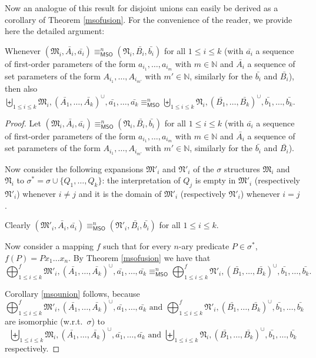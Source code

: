 \documentclass{LMCS}
\newcommand{\frM}{\mathfrak{M}}
\newcommand{\frN}{\mathfrak{N}}
\newcommand{\mso}{\textsf{MSO}\xspace}
\begin{document}
\noindent Now an analogue of this result for disjoint unions can easily be derived as a corollary of Theorem \ref{msofusion}. For the convenience of the reader, we provide here the detailed argument:


\begin{cor}
Whenever $(\frM_i,\bar{A_i},
\bar{a_i})\equiv_\mso^n(\frN_i,\bar{B_i},\bar{b_i})$ for all $1
\leq i \leq k$ (with $\bar{a_i}$ a sequence of first-order
parameters of the form $a_{i_1},\ldots,a_{i_m}$ with
$m\in\mathbb{N}$ and $\bar{A_i}$ a sequence of set parameters of
the form $A_{i_1},\ldots,A_{i_{m'}}$ with $m'\in\mathbb{N}$,
similarly for the $\bar{b_i}$ and $\bar{B_i}$), then also
$\biguplus_{ 1 \leq i \leq k} \frM_i,(\bar{A_1},
\ldots, \bar{A_k})^\cup, \bar{a_1},\ldots,\bar{a_k}\equiv_\mso^n
\biguplus_{ 1 \leq i \leq k} \frN_i, (\bar{B_1},
\ldots, \bar{B_k})^\cup, \bar{b_1},\ldots,\bar{b_k}$.\label{msounion}
\end{cor}

\begin{proof}
Let $(\frM_i,\bar{A_i},\bar{a_i})\equiv_\mso^n(\frN_i,\bar{B_i},\bar{b_i})$ for all $1
\leq i \leq k$ (with $\bar{a_i}$ a sequence of first-order
parameters of the form $a_{i_1},\ldots,a_{i_m}$ with
$m\in\mathbb{N}$ and $\bar{A_i}$ a sequence of set parameters of
the form $A_{i_1},\ldots,A_{i_{m'}}$ with $m'\in\mathbb{N}$,
similarly for the $\bar{b_i}$ and $\bar{B_i}$).

Now consider the following expansions $\frM'_i$ and $\frN'_i$ of the $\sigma$ structures $\frM_i$ and $\frN_i$ to $\sigma^*=\sigma \cup \{Q_1,\ldots,Q_k\}$:
the interpretation of $Q_j$ is empty in $\frM'_i$ (respectively $\frN'_i$) whenever $i \neq j$ and it is the domain of $\frM'_i$ (respectively $\frN'_i$) whenever $i=j$.

Clearly $(\frM'_i,\bar{A_i},\bar{a_i})\equiv_\mso^n(\frN'_i,\bar{B_i},\bar{b_i})$ for all $1
\leq i \leq k$.

Now consider a mapping $f$ such that for every $n$-ary predicate $P \in \sigma^*$, $f(P)=Px_1 \ldots x_n$. By Theorem \ref{msofusion} we have that $$\bigoplus_{1\leq i\leq k}^f \frM'_i,(\bar{A_1},
\ldots, \bar{A_k})^\cup, \bar{a_1},\ldots,\bar{a_k}\equiv_\mso^n
\bigoplus_{ 1 \leq i \leq k}^f \frN'_i, (\bar{B_1},
\ldots, \bar{B_k})^\cup, \bar{b_1},\ldots,\bar{b_k}.$$

Corollary \ref{msounion} follows, because $$\bigoplus_{1\leq i\leq k}^f \frM'_i,(\bar{A_1},
\ldots, \bar{A_k})^\cup, \bar{a_1},\ldots,\bar{a_k}\text{ and }\bigoplus_{ 1 \leq i \leq k}^f \frN'_i, (\bar{B_1},
\ldots, \bar{B_k})^\cup, \bar{b_1},\ldots,\bar{b_k}$$ are isomorphic (w.r.t.~$\sigma$) to $$\biguplus_{ 1 \leq i \leq k} \frM_i,(\bar{A_1},
\ldots, \bar{A_k})^\cup, \bar{a_1},\ldots,\bar{a_k}\text{ and }\biguplus_{ 1 \leq i \leq k} \frN_i, (\bar{B_1},
\ldots, \bar{B_k})^\cup, \bar{b_1},\ldots,\bar{b_k}$$ respectively.
\end{proof}
\end{document}
